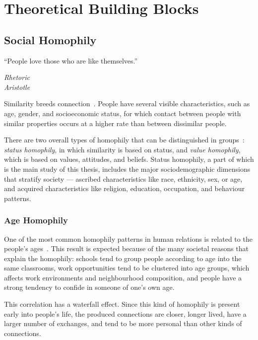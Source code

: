 
\chapter{Theoretical Building Blocks}
\label{chap:theoretical_intro}

\section{Social Homophily}

\epigraph{``People love those who are like themselves.''}{\textit{Rhetoric \\ Aristotle}}

Similarity breeds connection~\cite{mcpherson2001birds}. People have several visible characteristics, such as age, gender, and socioeconomic status, for which contact between people with similar properties occurs at a higher rate than between dissimilar people.

There are two overall types of homophily that can be distinguished in groups~\cite{lazarsfeld1954}: \textit{status homophily}, in which similarity is based on status, and \textit{value homophily}, which is based on values, attitudes, and beliefs. Status homophily, a part of which is the main study of this thesis, includes the major sociodemographic dimensions that stratify society --- ascribed characteristics like race, ethnicity, sex, or age, and acquired characteristics like religion, education, occupation, and behaviour patterns.

\subsection{Age Homophily}

One of the most common homophily patterns in human relations is related to the people's ages~\cite{ugander2011}\cite{mcpherson2001birds}. This result is expected because of the many societal reasons that explain the homophily: schools tend to group people according to age into the same classrooms, work opportunities tend to be clustered into age groups, which affects work environments and neighbourhood composition, and people have a strong tendency to confide in someone of one's own age.

This correlation has a waterfall effect. Since this kind of homophily is present early into people's life, the produced connections are closer, longer lived, have a larger number of exchanges, and tend to be more personal than other kinds of connections.

